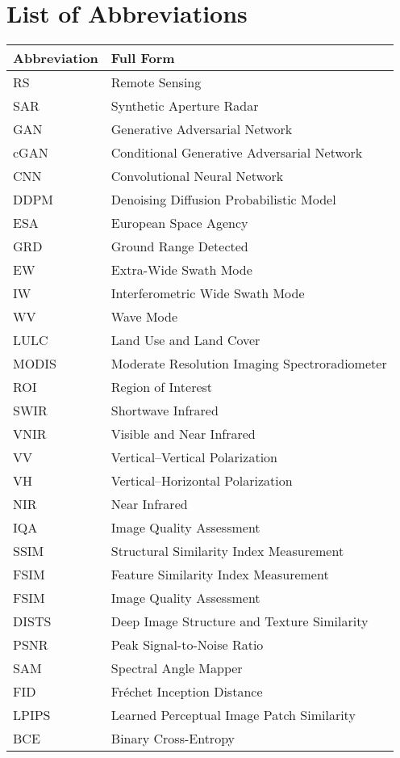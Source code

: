 \chapter*{List of Abbreviations}

\begin{table}[h!]
\centering
\begin{tabular}{ll}
\textbf{Abbreviation} & \textbf{Full Form} \\
\midrule
RS      & Remote Sensing \\
SAR     & Synthetic Aperture Radar \\
GAN     & Generative Adversarial Network \\
cGAN    & Conditional Generative Adversarial Network \\
CNN     & Convolutional Neural Network \\
DDPM    & Denoising Diffusion Probabilistic Model \\
ESA     & European Space Agency \\
GRD     & Ground Range Detected \\
EW      & Extra-Wide Swath Mode \\
IW      & Interferometric Wide Swath Mode \\
WV      & Wave Mode \\
LULC    & Land Use and Land Cover \\
MODIS   & Moderate Resolution Imaging Spectroradiometer \\
ROI     & Region of Interest \\
SWIR    & Shortwave Infrared \\
VNIR    & Visible and Near Infrared \\
VV      & Vertical–Vertical Polarization \\
VH      & Vertical–Horizontal Polarization \\
NIR     & Near Infrared \\
IQA     & Image Quality Assessment \\
SSIM    & Structural Similarity Index Measurement \\
FSIM    & Feature Similarity Index Measurement \\
FSIM    & Image Quality Assessment \\
DISTS   & Deep Image Structure and Texture Similarity \\
PSNR    & Peak Signal-to-Noise Ratio \\
SAM     & Spectral Angle Mapper \\
FID     & Fréchet Inception Distance \\
LPIPS   & Learned Perceptual Image Patch Similarity \\
BCE     & Binary Cross-Entropy \\
\end{tabular}
\end{table}
